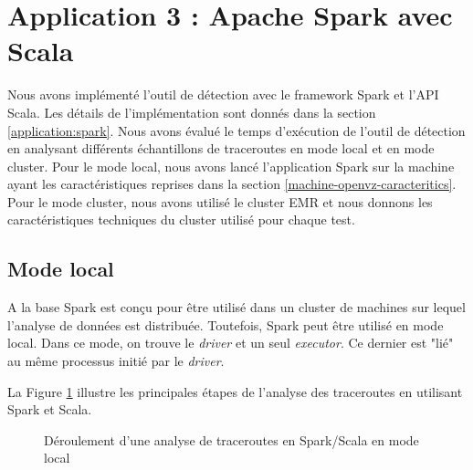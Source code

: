 \section{Application 3 : Apache Spark  avec Scala}
Nous avons implémenté l'outil de détection avec le framework Spark et l'API Scala. Les détails de l'implémentation sont donnés dans la section \ref{application:spark}.  Nous avons évalué le temps d'exécution de l'outil de détection en analysant différents échantillons de traceroutes  en mode local et en mode cluster. Pour le mode local, nous avons lancé l'application Spark sur la machine ayant les caractéristiques  reprises dans la section \ref{machine-openvz-caracteritics}. Pour le mode cluster, nous avons utilisé le cluster EMR et nous donnons les caractéristiques techniques du cluster utilisé pour chaque test.


\subsection{Mode local}

A la base Spark est conçu pour être utilisé dans un cluster de machines sur  lequel l'analyse de données est distribuée. Toutefois, Spark peut être utilisé en mode local. Dans ce mode, on trouve le \textit{driver} et un seul \textit{executor}. Ce dernier est "lié" au même processus initié par le \textit{driver}. 



La Figure \ref{fig:sparktimingLocal} illustre les principales étapes de l'analyse des traceroutes en utilisant Spark et Scala.

\begin{figure}[H]
	\centering
	\captionsetup{justification=centering}
	\resizebox{\textwidth}{!}{
		
	}
	\caption{Déroulement d'une analyse de  traceroutes en Spark/Scala en mode local }
	\label{fig:sparktimingLocal}
\end{figure}


